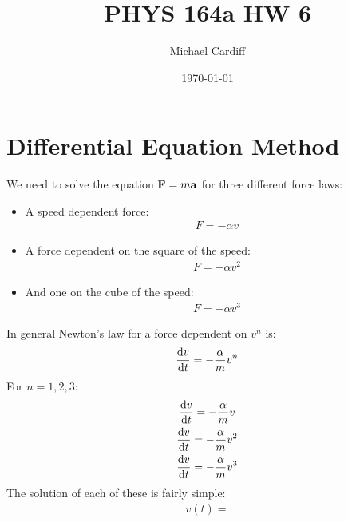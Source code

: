 \documentclass[12pt]{article}
\title{\vspace{-3em}PHYS 164a HW 6}
\author{Michael Cardiff}
\date{\today}
\begin{document}
\maketitle
\section{Differential Equation Method}
We need to solve the equation $\vb{F}=m\vb{a}$ for three different force laws:
\begin{itemize}
\item A speed dependent force:
  \begin{align*}
    F=-\alpha v
  \end{align*}
\item A force dependent on the square of the speed:
  \begin{align*}
    F=-\alpha v^2
  \end{align*}
\item And one on the cube of the speed:
  \begin{align*}
    F=-\alpha v^3
  \end{align*}
\end{itemize}
In general Newton's law for a force dependent on $v^n$ is:
\begin{align*}
  \dv{v}{t}=-\frac{\alpha}{m}v^n
\end{align*}
For $n=1,2,3$:
\begin{gather*}
  \dv{v}{t}=-\frac{\alpha}{m}v\\
  \dv{v}{t}=-\frac{\alpha}{m}v^2\\
  \dv{v}{t}=-\frac{\alpha}{m}v^3
\end{gather*}
The solution of each of these is fairly simple:
\begin{align*}
  v(t)=
\end{align*}
\end{document}
